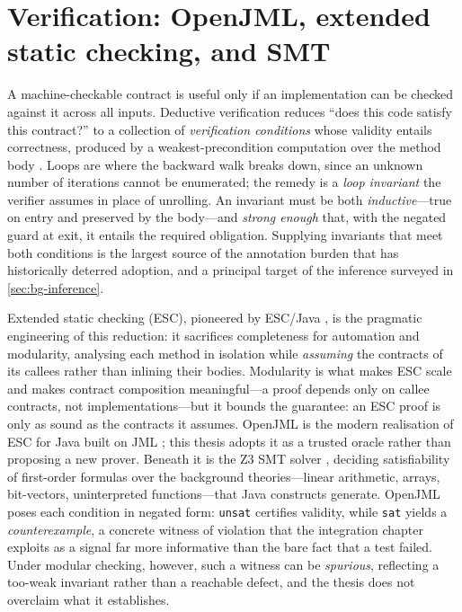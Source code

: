 \section{Verification: OpenJML, extended static checking, and SMT}\label{sec:bg-verification}

A machine-checkable contract is useful only if an implementation can be checked
against it across all inputs. Deductive verification reduces ``does this code
satisfy this contract?'' to a collection of \emph{verification conditions} whose
validity entails correctness, produced by a weakest-precondition computation over
the method body \cite{dijkstra1976discipline,manna1980deductive}. Loops are where
the backward walk breaks down, since an unknown number of iterations cannot be
enumerated; the remedy is a \emph{loop invariant} the verifier assumes in place of
unrolling. An invariant must be both \emph{inductive}---true on entry and preserved
by the body---and \emph{strong enough} that, with the negated guard at exit, it
entails the required obligation. Supplying invariants that meet both conditions is
the largest source of the annotation burden that has historically deterred
adoption, and a principal target of the inference surveyed in
\cref{sec:bg-inference}.

Extended static checking (ESC), pioneered by ESC/Java \cite{flanagan2002escjava},
is the pragmatic engineering of this reduction: it sacrifices completeness for
automation and modularity, analysing each method in isolation while \emph{assuming}
the contracts of its callees rather than inlining their bodies. Modularity is what
makes ESC scale and makes contract composition meaningful---a proof depends only on
callee contracts, not implementations---but it bounds the guarantee: an ESC proof
is only as sound as the contracts it assumes. OpenJML is the modern realisation of
ESC for Java built on JML \cite{cok2011openjml,cok2014openjml}; this thesis adopts
it as a trusted oracle rather than proposing a new prover. Beneath it is the Z3 SMT
solver \cite{demoura2008z3}, deciding satisfiability of first-order formulas over
the background theories---linear arithmetic, arrays, bit-vectors, uninterpreted
functions---that Java constructs generate. OpenJML poses each condition in negated
form: \texttt{unsat} certifies validity, while \texttt{sat} yields a
\emph{counterexample}, a concrete witness of violation that the integration chapter
exploits as a signal far more informative than the bare fact that a test failed.
Under modular checking, however, such a witness can be \emph{spurious}, reflecting
a too-weak invariant rather than a reachable defect, and the thesis does not
overclaim what it establishes.

